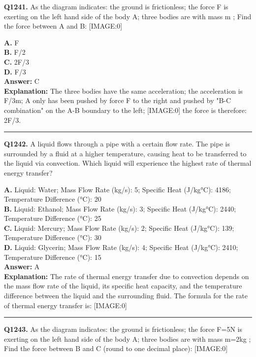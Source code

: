 \documentclass[12pt]{article}
\begin{document}
\noindent
\textbf{Q1241.} As the diagram indicates: the ground is frictionless; the force
F
is exerting on the left hand side of the body A; three bodies are with mass
m
; Find the force between A and B:
[IMAGE:0]



\textbf{A.} F \\
\textbf{B.} F/2 \\
\textbf{C.} 2F/3 \\
\textbf{D.} F/3 \\

\textbf{Answer:} C \\
\textbf{Explanation:} The three bodies have the same acceleration; the acceleration is F/3m; A only has been pushed by force
F
to the right and pushed by "B-C combination" on the A-B boundary to the left;
[IMAGE:0]
the force is therefore: 2F/3.

\hrule
\vspace{1em}


\noindent
\textbf{Q1242.} A liquid flows through a pipe with a certain flow rate.
The pipe is surrounded by a fluid at a higher temperature, causing heat to be transferred to the liquid via convection.
Which liquid will experience the highest rate of thermal energy transfer?



\textbf{A.} Liquid: Water; Mass Flow Rate (kg/s): 5; Specific Heat (J/kg\cdot °C): 4186; Temperature Difference (°C): 20 \\
\textbf{B.} Liquid: Ethanol; Mass Flow Rate (kg/s): 3; Specific Heat (J/kg\cdot °C): 2440; Temperature Difference (°C): 25 \\
\textbf{C.} Liquid: Mercury; Mass Flow Rate (kg/s): 2; Specific Heat (J/kg\cdot °C): 139; Temperature Difference (°C): 30 \\
\textbf{D.} Liquid: Glycerin; Mass Flow Rate (kg/s): 4; Specific Heat (J/kg\cdot °C): 2410; Temperature Difference (°C): 15 \\

\textbf{Answer:} A \\
\textbf{Explanation:} The rate of thermal energy transfer due to convection depends on the mass flow rate of the liquid, its specific heat capacity, and the temperature difference between the liquid and the surrounding fluid. The formula for the rate of thermal energy transfer is:
[IMAGE:0]

\hrule
\vspace{1em}


\noindent
\textbf{Q1243.} As the diagram indicates: the ground is frictionless; the force F=5N
is exerting on the left hand side of the body A; three bodies are with mass m=2kg
; Find the force between B and C (round to one decimal place):
[IMAGE:0]
\end{document}
